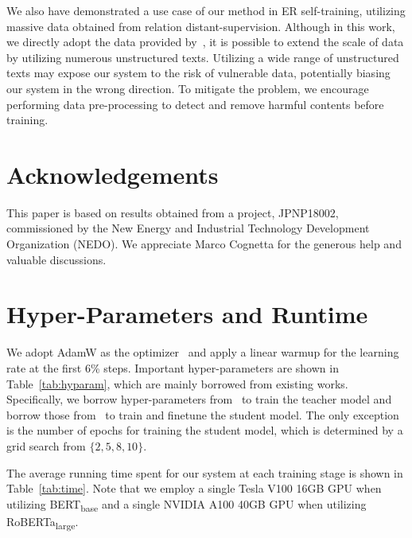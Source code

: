 \documentclass[11pt]{article}
\begin{document}
We also have demonstrated a use case of our method in ER self-training, utilizing massive data obtained from relation distant-supervision.
Although in this work, we directly adopt the data provided by~\citet{yao-etal-2019-docred}, it is possible to extend the scale of data by utilizing numerous unstructured texts.
Utilizing a wide range of unstructured texts may expose our system to the risk of vulnerable data, potentially biasing our system in the wrong direction.
To mitigate the problem, we encourage performing data pre-processing to detect and remove harmful contents before training.

\section*{Acknowledgements}

This paper is based on results obtained from a project, JPNP18002, commissioned by the New Energy and Industrial Technology Development Organization (NEDO).
We appreciate Marco Cognetta for the generous help and valuable discussions.




\appendix

\section{Hyper-Parameters and Runtime}
\label{sec:hyparam}

We adopt AdamW as the optimizer~\cite{loshchilov2018decoupled} and apply a linear warmup for the learning rate at the first 6\% steps.
Important hyper-parameters are shown in Table~\ref{tab:hyparam}, which are mainly borrowed from existing works.
Specifically, we borrow hyper-parameters from~\citet{zhou2021atlop} to train the teacher model and borrow those from~\citet{tan-etal-2022-document} to train and finetune the student model. 
The only exception is the number of epochs for training the student model, which is determined by a grid search from $\{2, 5, 8, 10\}$.

The average running time spent for our system at each training stage is shown in Table~\ref{tab:time}.
Note that we employ a single Tesla V100 16GB GPU when utilizing BERT\textsubscript{base} and a single NVIDIA A100 40GB GPU when utilizing RoBERTa\textsubscript{large}.
\end{document}
